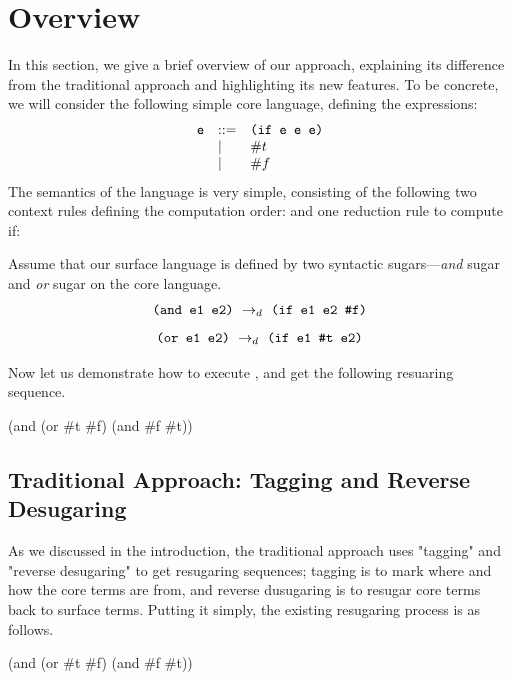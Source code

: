 \section{Overview}
\label{sec2}

In this section, we give a brief overview of our approach, explaining its difference from the traditional approach and highlighting its new features. To be concrete, we will consider the following simple core language, defining the  expressions:
\[
\begin{array}{lll}
\mbox{\tt e} &::=& \texttt{(if~e~e~e)}\\
& |& \#t\\
& |& \#f
\end{array}
\]
The semantics of the language is very simple, consisting of the following two context rules defining the computation order:
{\rightarrow{}}
and one reduction rule to compute \mbox{if}:

Assume that our surface language is defined by two syntactic sugars---\emph{and} sugar and \emph{or} sugar on the core language.
\[
\texttt{(and e1 e2)} ~\rightarrow_d~ \texttt{(if e1 e2 \#f)}
\]
\[
\texttt{(or e1 e2)} ~\rightarrow_d~ \texttt{(if e1 \#t e2)}
\]

Now let us demonstrate how to execute , and get the following resuaring sequence.
\begin{Codes}
    (and (or \#t \#f) (and \#f \#t))
\end{Codes}



\subsection{Traditional Approach: Tagging and Reverse Desugaring}

As we discussed in the introduction, the traditional approach uses "tagging" and "reverse desugaring" to get resugaring sequences; tagging is to mark where and how the core terms are from, and reverse dusugaring is to resugar core terms back to surface terms. Putting it simply, the existing resugaring process is as follows.

\begin{Codes}
    (and (or \#t \#f) (and \#f \#t))
 
\end{Codes}

